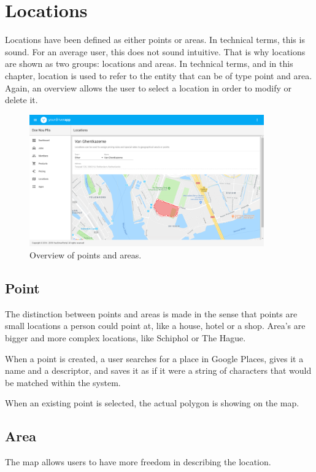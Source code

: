 \section{Locations}
Locations have been defined as either points or areas. In technical terms, this is sound. For an average user, this does not sound intuitive. That is why locations are shown as two groups: locations and areas. In technical terms, and in this chapter, location is used to refer to the entity that can be of type point and area. Again, an overview allows the user to select a location in order to modify or delete it.

\begin{figure}[H]
	\centering
	\includegraphics[width=0.9\textwidth]{Locations}
	\caption[Locations Overview]{Overview of points and areas.}
	\label{fig:Locations Overview}
\end{figure}

\subsection{Point}
The distinction between points and areas is made in the sense that points are small locations a person could point at, like a house, hotel or a shop. Area's are bigger and more complex locations, like Schiphol or The Hague.

When a point is created, a user searches for a place in Google Places, gives it a name and a descriptor, and saves it as if it were a string of characters that would be matched within the system.

When an existing point is selected, the actual polygon is showing on the map.

\subsection{Area}
The map allows users to have more freedom in describing the location.

